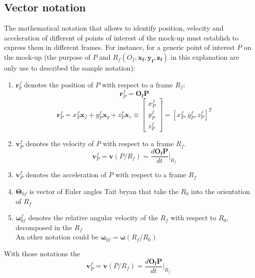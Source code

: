 \documentclass{article}
\begin{document}
\subsection{Vector notation}

The mathematical notation that allows to identify position, velocity and acceleration of different of points of interest of the mock-up must establish to express them in different frames. For instance, for a generic point of interest $P$ on the mock-up (the purpose of $P$ and $R_f (O_f,\mathbf{x_f}, \mathbf{y_f}, \mathbf{z_f})$ in this explanation are only use to described the sample notation):

\begin{enumerate}
	\item $\mathbf{r}_p^f$ denotes the position of $P$ with respect to a frame $R_f$: \\
	\begin{equation}\mathbf{r}_P^f = \mathbf{O_f P} \end{equation}
	\begin{equation}
	\mathbf{r}_P^f = x_P^f \mathbf{x}_f  + y_P^f \mathbf{x}_y + z_P^f \mathbf{x}_z \equiv \begin{bmatrix}
	x_P^f \\
	y_P^f \\
	z_P^f
	\end{bmatrix}
	= [x_P^f , y_P^f, z_P^f ]^T
	\end{equation}
	\item $\mathbf{v}_P^f$ denotes the velocity of $P$ with respect to a frame $R_f$.
	\\
	\begin{equation} \displaystyle \mathbf{v}_P^f = \mathbf{v}(P/R_f)  = \frac{d \mathbf{O_f P}}{dt}\Biggr\rvert_{R_f} \end{equation}
	
	\item $\dot{\mathbf{v}}_P^f$ denotes the acceleration of $P$ with respect to a frame $R_f$
	\item $ \mathbf{\Theta}_{0f}$ is vector of Euler angles Tait bryan that take the $R_0$ into the orientation of  $R_f$ 
	\item $\mathbf{\omega}_{0f}^f$ denotes the relative angular velocity of the $R_f$ with respect to $R_0$, decomposed in the $R_f$ \\
	An other notation could be $\mathbf{\omega}_{0f} = \mathbf{\omega}(R_f / R_0)$
\end{enumerate}

With those notations the 
\begin{equation} \displaystyle \mathbf{v}_P^f = \mathbf{v}(P/R_f)  = \frac{d \mathbf{O_f P}}{dt}\Biggr\rvert_{R_f} \end{equation}
\end{document}
